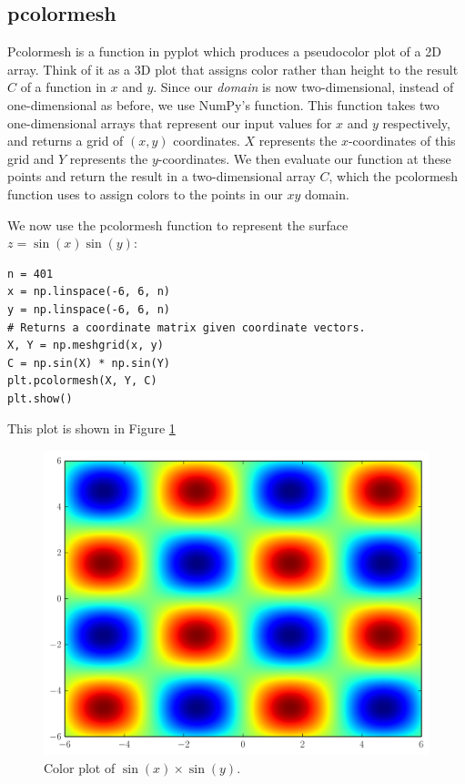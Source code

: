 \subsection*{pcolormesh}
Pcolormesh is a function in pyplot which produces a pseudocolor plot of a 2D array.
Think of it as a 3D plot that assigns color rather than height to the result $C$ of a function in $x$ and $y$.
Since our \emph{domain} is now two-dimensional, instead of one-dimensional as before, we use NumPy's  function.
This function takes two one-dimensional arrays that represent our input values for $x$ and $y$ respectively, and returns a grid of $(x, y)$ coordinates.
$X$ represents the $x$-coordinates of this grid and $Y$ represents the $y$-coordinates.
We then evaluate our function at these points and return the result in a two-dimensional array $C$, which the pcolormesh function uses to assign colors to the points in our $xy$ domain.

We now use the pcolormesh function to represent the surface $z=\sin(x)\sin(y)$:
\begin{lstlisting}
n = 401
x = np.linspace(-6, 6, n)
y = np.linspace(-6, 6, n)
# Returns a coordinate matrix given coordinate vectors.
X, Y = np.meshgrid(x, y)
C = np.sin(X) * np.sin(Y)
plt.pcolormesh(X, Y, C)
plt.show()
\end{lstlisting}
This plot is shown in Figure \ref{fig:pcmexample}
\begin{figure}
\includegraphics[width=\textwidth]{sinxsiny.png}
\caption{Color plot of $\sin\left(x\right)\times\sin\left(y\right)$.}
\label{fig:pcmexample}
\end{figure}

